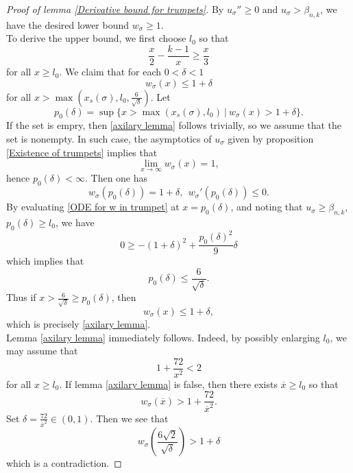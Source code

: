 \documentclass[10pt,a4paper]{amsart}
\begin{document}
\begin{proof}[Proof of lemma \ref{Derivative bound for trumpets}]
 By $u_{\sigma}'' \geq 0$ and $u_{\sigma} > \beta_{n,k}$, we have the desired lower bound $w_{\sigma} \geq 1$. \\
 
 To derive the upper bound, we first choose $l_0$ so that
\begin{equation}\label{condition on x1}
    \frac{x}{2} - \frac{k-1}{x }\geq \frac{x}{3}
\end{equation}
for all $x \geq l_0$. We claim that for each $0 <\delta <1$
    \begin{equation}\label{axilary lemma}
        w_{\sigma}(x) \leq 1 + \delta
    \end{equation}
    for all $x > \max(x_{s}(\sigma), l_0,   \frac{6}{\sqrt{\delta}})$. Let 
    \begin{equation}
        p_0(\delta) = \sup\{x > \max(x_{s}(\sigma), l_0) \ | \ w_{\sigma}(x) > 1 + \delta \}.
    \end{equation}
    If the set is empry, then \eqref{axilary lemma} follows trivially, so we assume that the set is nonempty. In such case, the asymptotics of $u_{\sigma}$ given by proposition \ref{Existence of trumpets} implies that
    \begin{equation}
        \lim_{x \to \infty}w_{\sigma}(x) = 1,
    \end{equation}
    hence $p_0(\delta) < \infty$.  Then one has
   $$w_{\sigma}(p_0(\delta)) = 1 + \delta, \ \ w_{\sigma}'(p_{0}(\delta)) \leq 0.$$
   By evaluating \eqref{ODE for w in trumpet} at $x = p_0(\delta)$, and noting that $u_{\sigma} \geq \beta_{n,k}$, $p_0(\delta) \geq l_0$, we have 
   $$0 \geq -(1 + \delta)^2 + \frac{p_0(\delta)^2}{9}\delta$$
   which implies that
   \begin{equation}
       p_0(\delta) \leq \frac{6}{\sqrt{\delta}}.
   \end{equation}
   Thus if $x > \frac{6}{\sqrt{\delta}} \geq p_0(\delta)$, then
   $$w_{\sigma}(x) \leq 1 + \delta,$$
   which is precisely \eqref{axilary lemma}. \\

Lemma \eqref{axilary lemma} immediately follows. Indeed, by possibly enlarging $l_0$, we may assume that
\begin{equation}
    1 + \frac{72}{x^2} < 2
\end{equation}
for all $x \geq l_0$. If lemma \eqref{axilary lemma} is false, then there exists $\overline{x} \geq l_0$ so that
\begin{equation}
    w_{\sigma}(\overline{x}) > 1 + \frac{72}{\overline{x}^2}.
\end{equation}
Set $\delta = \frac{72}{\overline{x}^2} \in (0,1)$. Then we see that 
\begin{equation}
    w_{\sigma}(\frac{6\sqrt{2}}{\sqrt{\delta}}) > 1 + \delta
\end{equation}
which is a contradiction.
\end{proof}
\end{document}
